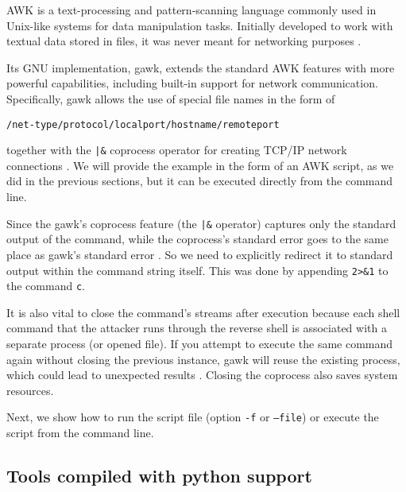 
AWK is a text-processing and pattern-scanning language commonly used in Unix-like systems for data manipulation tasks. Initially developed to work with textual data stored in files, it was never meant for networking purposes \cite{gawk-doc}.

Its GNU implementation, gawk, extends the standard AWK features with more powerful capabilities, including built-in support for network communication. Specifically, gawk allows the use of special file names in the form of

\qquad \texttt{/net-type/protocol/localport/hostname/remoteport}

together with the \texttt{|\&} coprocess operator for creating TCP/IP network connections \cite{gawk-man}. We will provide the example in the form of an AWK script, as we did in the previous sections, but it can be executed directly from the command line.


Since the gawk's coprocess feature (the \texttt{|\&} operator) captures only the standard output of the command, while the coprocess's standard error goes to the same place as gawk's standard error \cite{gawk-io}. So we need to explicitly redirect it to standard output within the command string itself. This was done by appending \texttt{2>\&1} to the command \texttt{c}.

It is also vital to close the command's streams after execution because each shell command that the attacker runs through the reverse shell is associated with a separate process (or opened file). If you attempt to execute the same command again without closing the previous instance, gawk will reuse the existing process, which could lead to unexpected results \cite{gawk-close}. Closing the coprocess also saves system resources.

Next, we show how to run the script file (option \texttt{-f} or \texttt{--file}) or execute the script from the command line.



\subsection{Tools compiled with python support}


